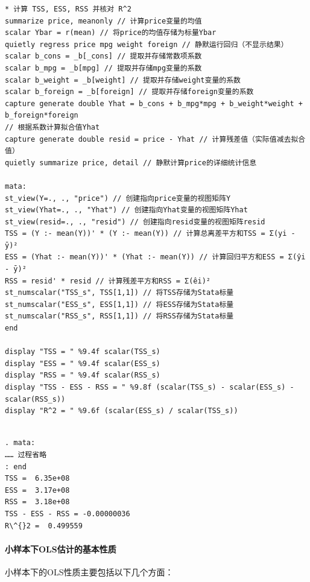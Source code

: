 \begin{tcolorbox}[title={在 Stata 的 Mata 中进行平方和分解（$TSS = ESS + RSS$）与 $R^2$ 计算}, colback=white, colframe=black, colbacktitle=white, coltitle=black, fonttitle=\bfseries]
	\begin{lstlisting}[xleftmargin=2em, commentstyle=\color{black}]
* 计算 TSS, ESS, RSS 并核对 R^2
summarize price, meanonly // 计算price变量的均值
scalar Ybar = r(mean) // 将price的均值存储为标量Ybar
quietly regress price mpg weight foreign // 静默运行回归（不显示结果）
scalar b_cons = _b[_cons] // 提取并存储常数项系数
scalar b_mpg = _b[mpg] // 提取并存储mpg变量的系数
scalar b_weight = _b[weight] // 提取并存储weight变量的系数
scalar b_foreign = _b[foreign] // 提取并存储foreign变量的系数
capture generate double Yhat = b_cons + b_mpg*mpg + b_weight*weight + b_foreign*foreign
// 根据系数计算拟合值Yhat
capture generate double resid = price - Yhat // 计算残差值（实际值减去拟合值）
quietly summarize price, detail // 静默计算price的详细统计信息

mata:
st_view(Y=., ., "price") // 创建指向price变量的视图矩阵Y
st_view(Yhat=., ., "Yhat") // 创建指向Yhat变量的视图矩阵Yhat
st_view(resid=., ., "resid") // 创建指向resid变量的视图矩阵resid
TSS = (Y :- mean(Y))' * (Y :- mean(Y)) // 计算总离差平方和TSS = Σ(yi - ȳ)²
ESS = (Yhat :- mean(Y))' * (Yhat :- mean(Y)) // 计算回归平方和ESS = Σ(ŷi - ȳ)²
RSS = resid' * resid // 计算残差平方和RSS = Σ(êi)²
st_numscalar("TSS_s", TSS[1,1]) // 将TSS存储为Stata标量
st_numscalar("ESS_s", ESS[1,1]) // 将ESS存储为Stata标量
st_numscalar("RSS_s", RSS[1,1]) // 将RSS存储为Stata标量
end

display "TSS = " %9.4f scalar(TSS_s)
display "ESS = " %9.4f scalar(ESS_s)
display "RSS = " %9.4f scalar(RSS_s)
display "TSS - ESS - RSS = " %9.8f (scalar(TSS_s) - scalar(ESS_s) - scalar(RSS_s))
display "R^2 = " %9.6f (scalar(ESS_s) / scalar(TSS_s))
	\end{lstlisting}
	\vspace{-2em}
	\begin{Verbatim}[commandchars=\\\{\},xleftmargin=2em]

. mata:
…… 过程省略
: end
TSS =  6.35e+08
ESS =  3.17e+08
RSS =  3.18e+08
TSS - ESS - RSS = -0.00000036
R\^{}2 =  0.499559
	\end{Verbatim}

\end{tcolorbox}

\paragraph*{小样本下OLS估计的基本性质}
小样本下的OLS性质主要包括以下几个方面：


